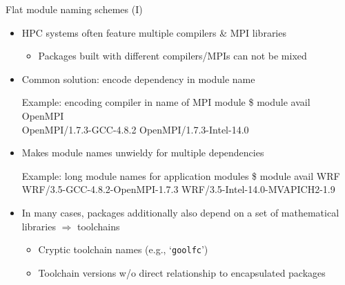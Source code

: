 \documentclass[10pt,xcolor={usenames,dvipsnames}]{beamer}
\begin{document}

\begin{frame}{Flat module naming schemes (I)}
\begin{itemize}
    \item
        HPC systems often feature multiple compilers \& MPI libraries
        \begin{itemize}
            \item
                Packages built with different compilers/MPIs can not
                be mixed
        \end{itemize}
    \item
        Common solution: encode dependency in module name\\
        \enskip
        \begin{minipage}{0.9\textwidth}
            \begin{exampleblock}{Example: encoding compiler in name of MPI module}
                \ttfamily
                \$ module avail OpenMPI\\
                OpenMPI/1.7.3-GCC-4.8.2
                    \quad OpenMPI/1.7.3-Intel-14.0
            \end{exampleblock}
        \end{minipage}
    \smallskip
    \item
        Makes module names unwieldy for multiple dependencies\\
        \enskip
        \begin{minipage}{0.9\textwidth}
            \begin{exampleblock}{Example: long module names for application modules}
                \ttfamily
                \$ module avail WRF\\
                WRF/3.5-GCC-4.8.2-OpenMPI-1.7.3
                    \quad WRF/3.5-Intel-14.0-MVAPICH2-1.9
            \end{exampleblock}
        \end{minipage}
    \smallskip
    \item
        In many cases, packages additionally also depend on a set of
        mathematical libraries $\Rightarrow$ toolchains
        \begin{itemize}
            \item
                Cryptic toolchain names (e.g., `\texttt{goolfc}')
            \item
                Toolchain versions w/o direct relationship to encapsulated packages
        \end{itemize}
\end{itemize}
\end{frame}
\end{document}
